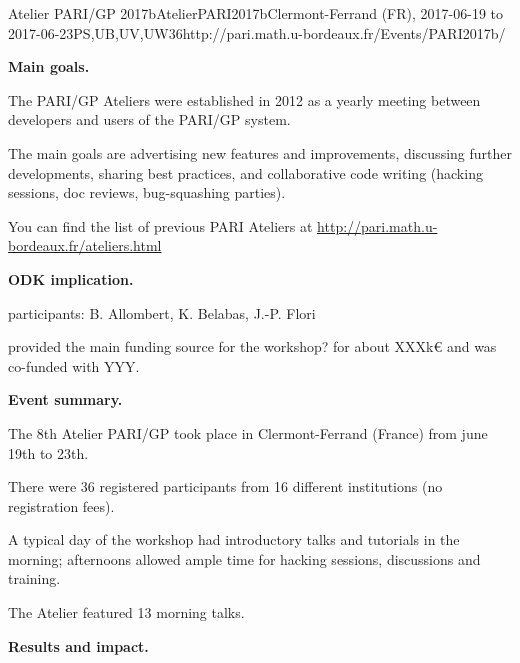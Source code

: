 \begin{event}{Atelier PARI/GP 2017b}{AtelierPARI2017b}{Clermont-Ferrand (FR),
2017-06-19 to 2017-06-23}{PS,UB,UV,UW}{36}{http://pari.math.u-bordeaux.fr/Events/PARI2017b/}

\textbf{Main goals.}

The PARI/GP Ateliers were established in 2012 as a yearly meeting
between developers and users of the PARI/GP system.

The main goals are advertising new features and improvements,
discussing further developments, sharing best practices, and collaborative
code writing (hacking sessions, doc reviews, bug-squashing parties).

You can find the list of previous PARI Ateliers at
\url{http://pari.math.u-bordeaux.fr/ateliers.html}

\textbf{ODK implication.} 

\ODK participants: B. Allombert, K. Belabas, J.-P. Flori

\ODK provided the main funding source for the workshop? for about XXXk\euro
and was co-funded with YYY.

\textbf{Event summary.} 

The 8th Atelier PARI/GP took place in Clermont-Ferrand (France) from june
19th to 23th.

There were 36 registered participants from 16 different institutions
(no registration fees).

A typical day of the workshop had introductory talks and tutorials
in the morning; afternoons allowed ample time for hacking sessions,
discussions and training.

The Atelier featured 13 morning talks.

\textbf{Results and impact.} 

\end{event}
